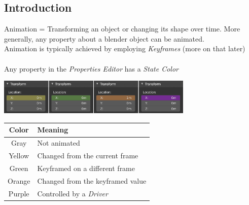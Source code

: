 \documentclass{article}
\begin{document}
\subsection{Introduction}

Animation = Transforming an object or changing its shape over time. More generally, any property about a blender object can be animated. \\
Animation is typically achieved by employing \textit{Keyframes} (more on that later) \\\\
Any property in the \textit{Properties Editor} has a \textit{State Color}

\begin{center}
    \includegraphics[width=0.7\textwidth]{blender_docs_images/animation_introduction_state-colors.png}
\end{center}

\begin{longtable}{cl}
    \toprule
    \textbf{Color} & \textbf{Meaning}                 \\
    \midrule
    \endhead
    \bottomrule
    \endfoot

    Gray           & Not animated                     \\
    Yellow         & Changed from the current frame   \\
    Green          & Keyframed on a different frame   \\
    Orange         & Changed from the keyframed value \\
    Purple         & Controlled by a \textit{Driver}  \\
\end{longtable}
\end{document}
